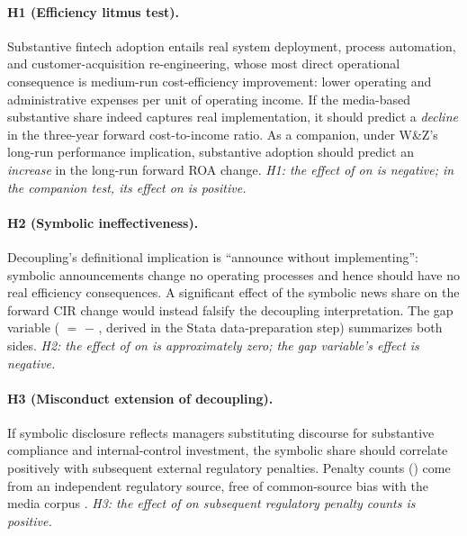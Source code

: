 \paragraph{H1 (Efficiency litmus test).}
Substantive fintech adoption entails real system deployment, process
automation, and customer-acquisition re-engineering, whose most direct
operational consequence is medium-run cost-efficiency improvement: lower
operating and administrative expenses per unit of operating income. If the
media-based substantive share  indeed captures real
implementation, it should predict a \emph{decline} in the three-year forward
cost-to-income ratio. As a companion, under W\&Z's long-run performance
implication, substantive adoption should predict an \emph{increase} in the
long-run forward ROA change.
\emph{H1: the effect of  on
 is negative; in the companion test,
its effect on  is positive.}

\paragraph{H2 (Symbolic ineffectiveness).}
Decoupling's definitional implication is ``announce without implementing'':
symbolic announcements change no operating processes and hence should have no
real efficiency consequences. A significant effect of the symbolic news share
 on the forward CIR change would instead falsify the
decoupling interpretation. The gap variable
( $=$  $-$
, derived in the Stata data-preparation step) summarizes
both sides.
\emph{H2: the effect of  on
 is approximately zero; the gap
variable's effect is negative.}

\paragraph{H3 (Misconduct extension of decoupling).}
If symbolic disclosure reflects managers substituting discourse for
substantive compliance and internal-control investment, the symbolic share
should correlate positively with subsequent external regulatory penalties.
Penalty counts () come from an independent
regulatory source, free of common-source bias with the media corpus
\parencite{heese2022newspaper}.
\emph{H3: the effect of  on subsequent regulatory penalty
counts is positive.}

